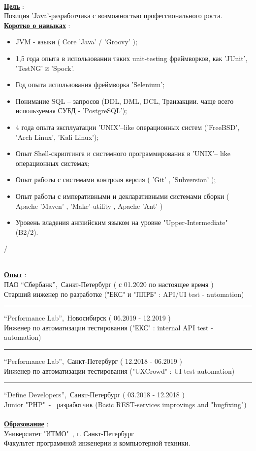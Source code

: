 \documentclass[hidelinks,12pt,a4paper,oneside]{article}
\begin{document}
\ 
\\[1px]
{\Large \underline{\textbf{Цель}}} :\\[4px]
{\large Позиция 'Java'-разработчика с возможностью профессионального роста.} \\[3px]
{\Large \underline{\textbf{Коротко о навыках}}} : 
{\large
\begin{itemize}[noitemsep]
	\item JVM - языки ( Core 'Java' /  'Groovy' );
	\item 1,5 года опыта в использовании таких unit-testing фреймворков, как  'JUnit', 'TestNG' и 'Spock'.
	\item Год опыта использования фреймворка 'Selenium';
	\item Понимание SQL – запросов (DDL, DML, DCL, Транзакции. чаще всего используемая СУБД -  'PostgreSQL');
	\item 4 года опыта эксплуатации 'UNIX'--like операционных систем ('FreeBSD', 'Arch Linux', 'Kali Linux');
	\item Опыт Shell-скриптинга и системного программирования в 'UNIX'-- like операционных системах;
	\item Опыт работы с системами контроля версия ( 'Git' , 'Subversion' );
	\item Опыт работы с императивными и декларативными системами сборки ( Apache 'Maven' , 'Make'-utility , Apache 'Ant' )
	\item Уровень владения английским языком на уровне "Upper-Intermediate" (B2/2).
\end{itemize}/
 }
\vspace{-20px}
\ \\
{\Large \underline{\textbf{Опыт}}} : \\ [6px]
{\large
ПАО “Сбербанк”,\ Санкт-Петербург {\small( с 01.2020 по настоящее время )} \\
Старший инженер по разработке ("ЕКС" и "ППРБ" : API/UI test - automation)
\vspace{-10px}
}\par\noindent\rule{\textwidth}{0.4pt}
{\large
“Performance Lab”,\ Новосибирск {\small( 06.2019 - 12.2019 )} \\
Инженер по автоматизации тестирования ("ЕКС" : internal API test - automation)
\vspace{-25px}
}\par\noindent\rule{\textwidth}{0.4pt}
{\large
“Performance Lab”,\ Санкт-Петербург {\small( 12.2018 - 06.2019 )} \\
Инженер по автоматизации тестирования ("UXCrowd" : UI test-automation)
\vspace{-10px}
}\par\noindent\rule{\textwidth}{0.4pt}
{\large
“Define Developers”,\ Санкт-Петербург {\small( 03.2018 - 12.2018 )} \\
Junior "PHP"\ - \ разработчик  (Basic REST-services improvings and "bugfixing") \\
}
\ \\
{\Large \underline{\textbf{Образование}}} : \\ [8px]
{\large
Университет "ИТМО"\ , г. Санкт-Петербург \\
Факультет программной инженерии и компьютерной техники.
}
\end{document}
